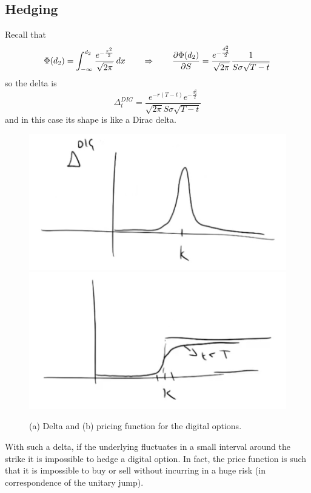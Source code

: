 \subsection{Hedging}
Recall that 
\begin{equation*}
    \Phi(d_2) = \int^{d_2}_{-\infty} \dfrac{e^{-\frac{x^2}{2}}}{\sqrt{2\pi}}\,dx \qquad\Rightarrow\qquad \pdv{\Phi(d_2)}{S} = \dfrac{e^{-\frac{d_2^2}{2}}}{\sqrt{2\pi}}\dfrac{1}{S\sigma\sqrt{T-t}}
\end{equation*}
so the delta is
\begin{equation}
    \Delta^{DIG}_t = \dfrac{e^{-r(T-t)}e^{-\frac{d_2^2}{2}}}{\sqrt{2\pi}S\sigma\sqrt{T-t}}
\end{equation}
and in this case its shape is like a Dirac delta.
\begin{figure}[htp]
    \centering
    \includegraphics[scale=0.3]{fig/tmp/fig24.png}
    \includegraphics[scale=0.3]{fig/tmp/fig25.png}
    \caption{(a) Delta and (b) pricing function for the digital options.}
    \label{fig:digdelta}
\end{figure}
With such a delta, if the underlying fluctuates in a small interval around the strike it is impossible to hedge a digital option. In fact, the price function is such that it is impossible to buy or sell without incurring in a huge risk (in correspondence of the unitary jump). \\
